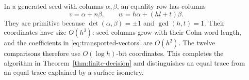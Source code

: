 In a generated seed with columns $\alpha,\beta$, an equality row has
columns
\begin{equation}\label{eq:transported-vectors}
 v=\alpha+n\beta,\qquad w=h\alpha+(hl+t)\beta.
\end{equation}
They are primitive because $\det(\alpha,\beta)=\pm1$ and
$\gcd(h,t)=1$. Their coordinates have size $O(h^3)$: seed columns grow
with their Cohn word length, and the coefficients in
\eqref{eq:transported-vectors} are $O(h^2)$. The twelve comparisons
therefore use $O(\log h)$-bit coordinates. This completes the algorithm
in Theorem~\ref{thm:finite-decision} and distinguishes an equal trace
from an equal trace explained by a surface isometry.
